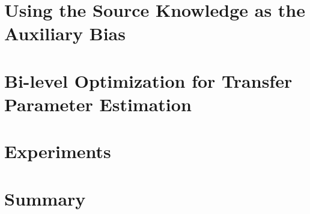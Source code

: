 \section{Using the Source Knowledge as the Auxiliary Bias}\label{sec:prob}


\section{Bi-level Optimization for Transfer Parameter Estimation}\label{sec:smitle}

%

\section{Experiments}\label{sec:exp}


\section{Summary}
